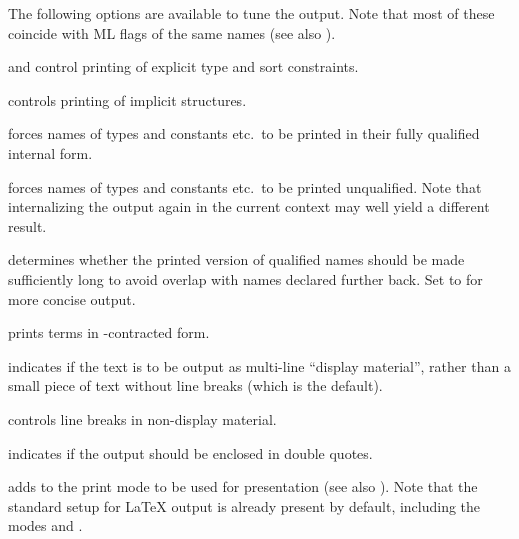 \begin{isabellebody}
\begin{isamarkuptext}
  \medskip
  The following options are available to tune the output.  Note that most of
  these coincide with ML flags of the same names (see also \cite{isabelle-ref}).

  \begin{descr}

  \item[\isa{show{\isacharunderscore}types\ {\isacharequal}\ bool} and \isa{show{\isacharunderscore}sorts\ {\isacharequal}\ bool}]
  control printing of explicit type and sort constraints.

  \item[\isa{show{\isacharunderscore}structs\ {\isacharequal}\ bool}] controls printing of implicit
  structures.

  \item[\isa{long{\isacharunderscore}names\ {\isacharequal}\ bool}] forces names of types and
  constants etc.\ to be printed in their fully qualified internal
  form.

  \item[\isa{short{\isacharunderscore}names\ {\isacharequal}\ bool}] forces names of types and
  constants etc.\ to be printed unqualified.  Note that internalizing
  the output again in the current context may well yield a different
  result.

  \item[\isa{unique{\isacharunderscore}names\ {\isacharequal}\ bool}] determines whether the printed
  version of qualified names should be made sufficiently long to avoid
  overlap with names declared further back.  Set to  for
  more concise output.

  \item[\isa{eta{\isacharunderscore}contract\ {\isacharequal}\ bool}] prints terms in \isa{{\isasymeta}}-contracted form.

  \item[\isa{display\ {\isacharequal}\ bool}] indicates if the text is to be
  output as multi-line ``display material'', rather than a small piece
  of text without line breaks (which is the default).

  \item[\isa{break\ {\isacharequal}\ bool}] controls line breaks in non-display
  material.

  \item[\isa{quotes\ {\isacharequal}\ bool}] indicates if the output should be
  enclosed in double quotes.

  \item[\isa{mode\ {\isacharequal}\ name}] adds  to the print mode to
  be used for presentation (see also \cite{isabelle-ref}).  Note that
  the standard setup for {\LaTeX} output is already present by
  default, including the modes  and .


\end{descr}
\end{isamarkuptext}
\end{isabellebody}
